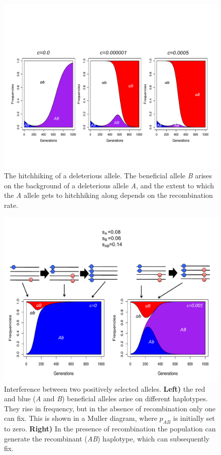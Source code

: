 \begin{figure}
\begin{center}
  \includegraphics[width = 0.9 \textwidth]{figures/selection_recom_interaction/Deleterious_Hitchhiking.pdf}
  \caption{The hitchhiking of a deleterious allele. The beneficial allele {\it B} arises on the background of a deleterious allele {\it A}, and the extent to which the {\it A} allele gets to hitchhiking along depends on the recombination rate. } \label{fig:deleterious_HH}  %
  \end{center}
\end{figure}


\begin{figure}
\begin{center}
  \includegraphics[width = 0.8 \textwidth]{figures/selection_recom_interaction/Interference_w_haps.pdf}
\end{center}
\caption{Interference between two positively selected alleles. {\bf Left)} the red and blue ({\it A} and {\it B}) beneficial alleles arise on different haplotypes. They rise in frequency, but in the absence of recombination only one can fix. This is shown in a Muller diagram, where $p_{AB}$ is initially set to zero. {\bf Right)} In the presence of recombination the population can generate the recombinant ({\it AB}) haplotype, which can subsequently fix. } \label{fig:Interference}  %
\end{figure}
